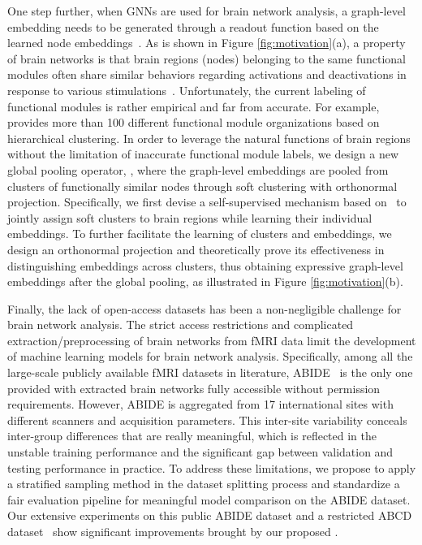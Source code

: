 One step further, when GNNs are used for brain network analysis, a graph-level embedding needs to be generated through a readout function based on the learned node embeddings~\cite{BrainNetCNN, li2020braingnn, braingb}. As is shown in Figure \ref{fig:motivation}(a), a property of brain networks is that brain regions (nodes) belonging to the same functional modules often share similar behaviors regarding activations and deactivations in response to various stimulations~\cite{functionalmodule}. Unfortunately, the current labeling of functional modules is rather empirical and far from accurate. For example,~\cite{akiki2019determining} provides more than 100 different functional module organizations based on hierarchical clustering. In order to leverage the natural functions of brain regions without the limitation of inaccurate functional module labels, we design a new global pooling operator, \pooling, where the graph-level embeddings are pooled from clusters of functionally similar nodes through soft clustering with orthonormal projection.  
Specifically, we first devise a self-supervised mechanism based on~\cite{xie2016unsupervised} to jointly assign soft clusters to brain regions while learning their individual embeddings. To further facilitate the learning of clusters and embeddings, we design an orthonormal projection and theoretically prove its effectiveness in distinguishing embeddings across clusters, thus obtaining expressive graph-level embeddings after the global pooling, as illustrated in Figure \ref{fig:motivation}(b).

Finally, the lack of open-access datasets has been a non-negligible challenge for brain network analysis. The strict access restrictions and complicated extraction/preprocessing of brain networks from fMRI data limit the development of machine learning models for brain network analysis. Specifically, among all the large-scale publicly available fMRI datasets in literature, ABIDE~\citep{abide} is the only one provided with extracted brain networks fully accessible without permission requirements. However, ABIDE is aggregated from 17 international sites with different scanners and acquisition parameters. This inter-site variability conceals inter-group differences that are really meaningful, which is reflected in the unstable training performance and the significant gap between validation and testing performance in practice. To address these limitations, we propose to apply a stratified sampling method in the dataset splitting process and standardize a fair evaluation pipeline for meaningful model comparison on the ABIDE dataset. Our extensive experiments on this public ABIDE dataset and a restricted ABCD dataset~\cite{ABCD} show significant improvements brought by our proposed \methodfull.